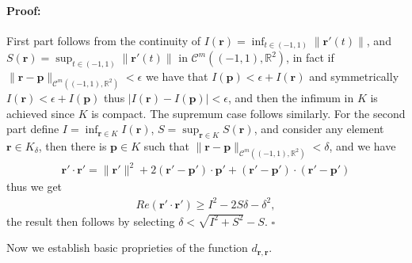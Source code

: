 \documentclass{article}
\newenvironment{proof}{\paragraph{Proof:}}{\hfill$\square$}
\newcommand{\IR}{{\mathbb R}}
\newcommand{\bp}{{\bm p}}
\newcommand{\cmspace}[3]{\mathcal{C}^{#1} \left( #2, #3 \right)}
\newcommand{\br}{\bm{r}}
\begin{document}
\begin{proof}
First part follows from the continuity of $I(\br) = \inf_{t \in (-1,1)} \| \br'(t)\|$, and $S(\br) = \sup_{t \in (-1,1)} \| \br'(t)\|$ in $\cmspace{m}{(-1,1)}{\IR^2}$, in fact if $\| \br -\bp \|_{\cmspace{m}{(-1,1)}{\IR^2}}< \epsilon$ we have that 
$I(\bp)  < \epsilon + I(\br)$
and symmetrically 
$
I(\br)  < \epsilon + I(\bp)
$
thus $|I(\br) - I(\bp)| < \epsilon$, and then the infimum in $K$ is achieved since $K$ is compact. The supremum case follows similarly. For the second part define $I = \inf_{\br \in K } I(\br)$, $S =\sup_{\br \in K } S(\br)$, and consider any element $\br \in K_\delta$, then there is $\bp \in K$ such that $\| \br -\bp \|_{\cmspace{m}{(-1,1)}{\IR^2}} < \delta$, and we have 
\begin{align*}
\br' \cdot \br' = \|\br'\|^2+ 2(\br' -\bp')\cdot \bp' +(\br'-\bp')\cdot(\br'-\bp') 
\end{align*}
thus we get
\begin{align*}
Re(\br' \cdot \br') \geq I^2 - 2S\delta -\delta^2, \end{align*}
the result then follows by selecting $\delta < \sqrt{I^2+S^2}-S$.
\end{proof} 

Now we establish basic proprieties of the function $d_{\br,\br}$. 
\end{document}

